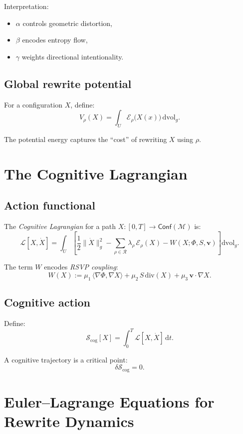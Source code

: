 Interpretation:
\begin{itemize}
  \item $\alpha$ controls geometric distortion,
  \item $\beta$ encodes entropy flow,
  \item $\gamma$ weights directional intentionality.
\end{itemize}

\subsection{Global rewrite potential}

For a configuration $X$, define:
\[
V_{\rho}(X)
=
\int_U \mathcal{E}_\rho\big(X(x)\big)\,\mathrm{dvol}_g.
\]

The potential energy captures the “cost” of rewriting $X$ using $\rho$.

\section{The Cognitive Lagrangian}

\subsection{Action functional}

The \emph{Cognitive Lagrangian} for a path
$X: [0,T] \to \mathsf{Conf}(\mathcal{M})$ is:
\[
\mathcal{L}[X, \dot{X}]
=
\int_U
\left[
\frac{1}{2} \|\dot{X}\|_g^2
-
\sum_{\rho\in\mathcal{R}} \lambda_\rho\, \mathcal{E}_\rho(X)
-
W(X; \Phi,S,\mathbf{v})
\right]\mathrm{dvol}_g.
\]

The term $W$ encodes \emph{RSVP coupling}:
\[
W(X) :=
\mu_1\,\langle\nabla\Phi, \nabla X\rangle
+
\mu_2\, S\,\mathrm{div}(X)
+
\mu_3\,\mathbf{v}\cdot\nabla X.
\]

\subsection{Cognitive action}

Define:
\[
\mathcal{S}_{\mathrm{cog}}[X]
=
\int_0^T \mathcal{L}[X,\dot{X}]\, \mathrm{d}t.
\]

A cognitive trajectory is a critical point:
\[
\delta \mathcal{S}_{\mathrm{cog}} = 0.
\]

\section{Euler--Lagrange Equations for Rewrite Dynamics}

